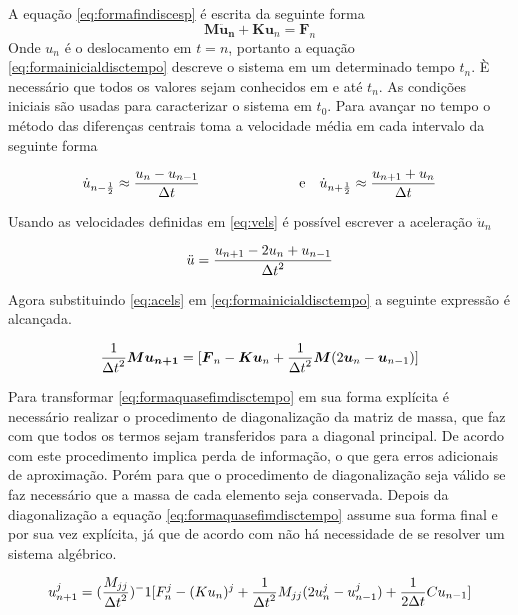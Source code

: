 A equação \ref{eq:formafindiscesp} é escrita da seguinte forma
    \begin{equation} \label{eq:formainicialdisctempo}
    \boldsymbol{M \ddot{u}_n } + \boldsymbol{K}\boldsymbol{u}_n = \boldsymbol{F}_n
\end{equation}
Onde $ u_n $ é o deslocamento em $t=n$, portanto a equação \ref{eq:formainicialdisctempo} descreve o sistema em um determinado tempo $t_n $. È necessário que todos os valores sejam conhecidos em e até $ t_n $. As condições iniciais são usadas para caracterizar o sistema em $ t_0 $. Para avançar no tempo o método das diferenças centrais toma a velocidade média em cada intervalo da seguinte forma

\begin{align} \label{eq:vels}
    \dot{u}_{n-\frac{1}{2}} \approx \ddfrac{u_n - u_{n-1}}{\Delta t} & \hspace{25mm} \text{e} & \dot{u}_{n+\frac{1}{2}} \approx \ddfrac{ u_{n+1} + u_n}{\Delta t} 
\end{align} 

Usando as velocidades definidas em \ref{eq:vels} é possível escrever a aceleração $ \ddot{u}_n $ 

\begin{equation} \label{eq:acels}
    \ddot{u} = \frac{\displaystyle u_{n+1} - 2u_n + u_{n-1}}{\displaystyle \Delta t^2}
\end{equation}

Agora substituindo \ref{eq:acels} em \ref{eq:formainicialdisctempo} a seguinte expressão é alcançada.

\begin{equation} \label{eq:formaquasefimdisctempo}
    \frac{\displaystyle 1}{\displaystyle \Delta t^2}\boldsymbol{M} \boldsymbol{u_{n+1}} = [\boldsymbol{F}_n - \boldsymbol{Ku}_n + \frac{\displaystyle 1}{\displaystyle \Delta t^2}\boldsymbol{M}(2\boldsymbol{u}_n - \boldsymbol{u}_{n-1}) ]
\end{equation}

Para transformar \ref{eq:formaquasefimdisctempo} em sua forma explícita é necessário realizar o procedimento de diagonalização da matriz de massa, que faz com que todos os termos sejam transferidos para a diagonal principal. De acordo com \cite{Paulo} este procedimento implica perda de informação, o que gera erros adicionais de aproximação. Porém para que o procedimento de diagonalização seja válido se faz necessário que a massa de cada elemento seja conservada. Depois da diagonalização a equação \ref{eq:formaquasefimdisctempo} assume sua forma final e por sua vez explícita, já que de acordo com \cite{Paulo} não há necessidade de se resolver um sistema algébrico.

\begin{equation}
    u^j_{n+1} = (\frac{\displaystyle M_{jj}}{\displaystyle \Delta t^2} )^-1 [F_n^j - (Ku_n)^j + \frac{\displaystyle 1}{\displaystyle \Delta t^2}M_{jj}(2u_n^j - u_{n-1}^j) + \frac{\displaystyle 1}{\displaystyle 2 \Delta t}C u_{n-1}]
\end{equation}

